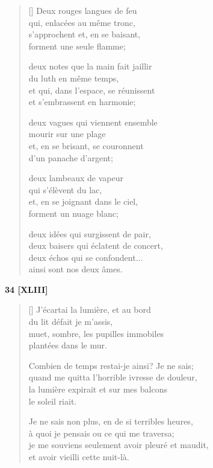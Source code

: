 \documentclass[a4paper,12pt]{book}
\begin{document}
\begin{verse}[\versewidth]
  Deux rouges langues de feu \\
  qui, enlacées au même tronc, \\
  s'approchent et, en se baisant, \\
  forment une seule flamme;

  deux notes que la main fait jaillir \\
  du luth en même temps, \\
  et qui, dans l'espace, se réunissent \\
  et s'embrassent en harmonie;

  deux vagues qui viennent ensemble \\
  mourir sur une plage \\
  et, en se brisant, se couronnent \\
  d'un panache d'argent;

  deux lambeaux de vapeur \\
  qui s'élèvent du lac, \\
  et, en se joignant dans le ciel, \\
  forment un nuage blanc;

  deux idées qui surgissent de pair, \\
  deux baisers qui éclatent de concert, \\
  deux échos qui se confondent... \\
  ainsi sont nos deux âmes.
\end{verse}

\bigskip

\begin{center}
  \textbf{34 [XLIII]}
   \end{center}

\settowidth{\versewidth}{je me souviens seulement avoir pleuré et maudit,}

\begin{verse}[\versewidth]
  J'écartai la lumière, et au bord \\
  du lit défait je m'assis, \\
  muet, sombre, les pupilles immobiles \\
  plantées dans le mur.

  Combien de temps restai-je ainsi? Je ne sais; \\
  quand me quitta l'horrible ivresse de douleur, \\
  la lumière expirait et sur mes balcons \\
  le soleil riait.

  Je ne sais non plus, en de si terribles heures, \\
  à quoi je pensais ou ce qui me traversa; \\
  je me souviens seulement avoir pleuré et maudit, \\
  et avoir vieilli cette nuit-là.
\end{verse}
\end{document}
